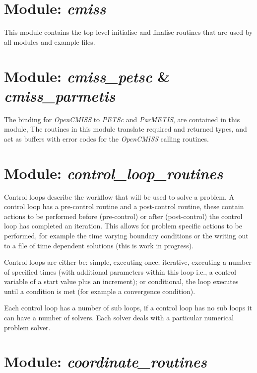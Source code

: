 \section{Module: \emph{cmiss}}
\label{sec:cmiss}

This module contains the top level initialise and finalise routines that are
used by all modules and example files.


\section{Module: \emph{cmiss\_petsc} \& \emph{cmiss\_parmetis}}
\label{sec:cmisspetscandcmissparmetis}

The binding for \emph{OpenCMISS} to \emph{PETSc} and \emph{ParMETIS}, 
are contained in this module, The routines in this module translate 
required and returned types, and act as buffers with error codes for the 
\emph{OpenCMISS} calling routines.


\section{Module: \emph{control\_loop\_routines}}
\label{sec:controllooproutines}

Control loops describe the workflow that will be used to solve a problem.
A control loop has a pre-control routine and a post-control routine, these 
contain actions to be performed before (pre-control) or after (post-control) 
the control loop has completed an iteration. This allows for problem specific 
actions to be performed, for example the time varying boundary conditions or 
the writing out to a file of time dependent solutions (this is work in
progress).

Control loops are either be: simple, executing once; iterative, executing a
number of specified times (with additional parameters within this loop i.e., 
a control variable of a start value plus an increment); or conditional, the 
loop executes until a condition is met (for example a convergence condition).

Each control loop has a number of sub loops, if a control loop has no sub loops 
it can have a number of solvers. Each solver deals with a particular numerical 
problem solver.


\section{Module: \emph{coordinate\_routines}}
\label{sec:coordinateroutines}

